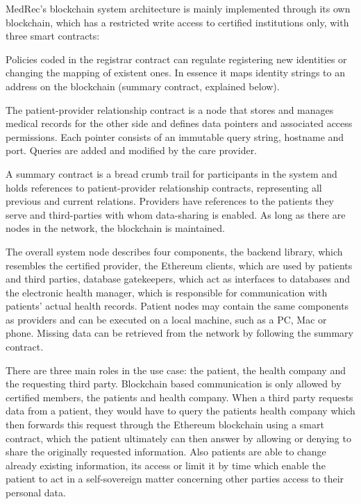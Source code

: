 
MedRec's blockchain system architecture is mainly implemented through its own blockchain, which has a restricted write access to
certified institutions only, with three smart contracts:


Policies coded in the registrar contract can regulate registering new identities or changing the mapping of existent ones.
In essence it maps identity strings to an address on the blockchain (summary contract, explained below).



The patient-provider relationship contract is a node that stores and manages medical records for the other side and defines
data pointers and associated access permissions. Each pointer consists of an immutable query string, hostname and port.
Queries are added and modified by the care provider.



A summary contract is a bread crumb trail for participants in the system and holds references to patient-provider relationship
contracts, representing all previous and current relations. Providers have references to the patients they serve and third-parties
with whom data-sharing is enabled. As long as there are nodes in the network, the blockchain is maintained.


The overall system node describes four components, the backend library, which resembles the certified provider, the
Ethereum clients, which are used by patients and third parties, database gatekeepers, which act as interfaces to databases
and the electronic health manager, which is responsible for communication with patients' actual health records.
Patient nodes may contain the same components as providers and can be executed on a local machine, such as a PC, Mac or phone.
Missing data can be retrieved from the network by following the summary contract.


There are three main roles in the use case: the patient, the health company and the requesting third party.
Blockchain based communication is only allowed by certified members, the patients and health company.
When a third party requests data from a patient, they would have to query the patients health company which then forwards this request through the
Ethereum blockchain using a smart contract, which the patient ultimately can then answer by allowing or denying to share the originally requested
information.
Also patients are able to change already existing information, its access or limit it by time which enable the
patient to act in a self-sovereign matter concerning other parties access to their personal data.


